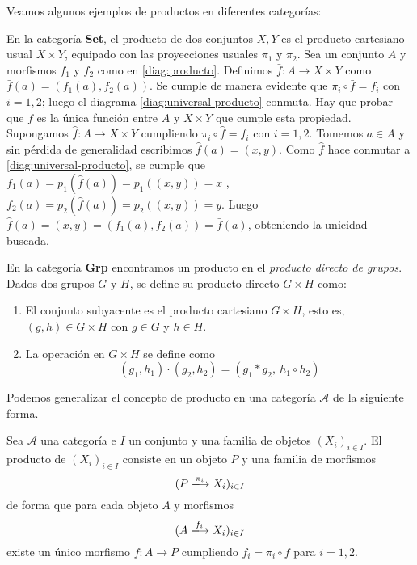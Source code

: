 Veamos algunos ejemplos de productos en diferentes categorías:

\begin{ejemplo}
    En la categoría \textbf{Set}, el producto de dos conjuntos $X,Y$ es el producto cartesiano usual $X \times Y$, equipado con las proyecciones usuales $\pi_{1}$ y $\pi_{2}$. Sea un conjunto $A$ y morfismos $f_1$ y $f_2$ como en \ref{diag:producto}. Definimos $\bar{f}: A \longrightarrow X \times Y$ como $\bar{f}(a) = (f_1(a),f_2(a))$. Se cumple de manera evidente que $\pi_i \circ \bar{f} = f_i$ con $i=1,2$; luego el diagrama \ref{diag:universal-producto} conmuta. Hay que probar que $\bar{f}$ es la única función entre $A$ y $X \times Y$ que cumple esta propiedad. Supongamos $\hat{f}: A \longrightarrow X \times Y$ cumpliendo $\pi_i \circ \hat{f} = f_i$ con $i=1,2$. Tomemos $a \in A$ y sin pérdida de generalidad escribimos $\hat{f}(a) = (x,y)$. Como $\hat{f}$ hace conmutar a \ref{diag:universal-producto}, se cumple que $f_1(a) = p_1(\hat{f}(a)) = p_1((x,y)) = x$ , $f_2(a) = p_2(\hat{f}(a)) = p_2((x,y)) = y$. Luego $\hat{f}(a) = (x,y) = (f_1(a),f_2(a)) = \bar{f}(a)$, obteniendo la unicidad buscada.
\end{ejemplo}

\begin{ejemplo}
    En la categoría \textbf{Grp} encontramos un producto en el \textit{producto directo de grupos}. Dados dos grupos $G$ y $H$, se define su producto directo $G \times H$ como: 
    \begin{enumerate}
        \item El conjunto subyacente es el producto cartesiano $G\times H$, esto es, $(g,h) \in G \times H$ con $g \in G$ y $h \in H$.
        \item La operación en $G \times H$ se define como \begin{equation}
            (g_1,h_1) \cdot (g_2,h_2) = (g_1*g_2, \ h_1\circ h_2)
        \end{equation}
    \end{enumerate}
\end{ejemplo}

Podemos generalizar el concepto de producto en una categoría $\mathscr{A}$ de la siguiente forma.

\begin{definicion}
    Sea $\mathscr{A}$ una categoría e $I$ un conjunto y una familia de objetos $(X_i)_{i\in I}$. El producto de $(X_i)_{i\in I}$ consiste en un objeto $P$ y una familia de morfismos \begin{equation}
        (P \xlongrightarrow{\pi_i} X_i)_{i \in I}
    \end{equation}
    de forma que para cada objeto $A$ y morfismos \begin{equation}
        (A \xlongrightarrow{f_i} X_i)_{i \in I}
    \end{equation}
    existe un único morfismo $\bar{f}: A \longrightarrow P$ cumpliendo $f_i = \pi_i \circ \bar{f}$ para $i=1,2$.
\end{definicion}

